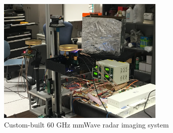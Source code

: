 \begin{figure}
\centering
\includegraphics[width=8cm,height=6cm]{./figure/experiment_setup.jpg}
\caption{Custom-built 60 GHz mmWave radar imaging system}
\end{figure}

\fi
